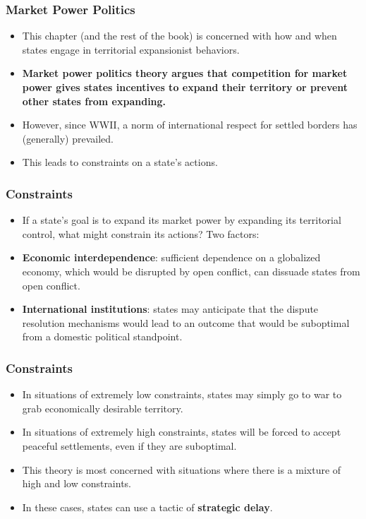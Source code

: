 \documentclass{beamer}
\begin{document}
\begin{frame} 
	\frametitle{\LARGE{Market Power Politics}}
	\begin{itemize}
		\item This chapter (and the rest of the book) is concerned with how and when states engage in territorial expansionist behaviors. \pause
		\item \textbf{Market power politics theory argues that competition for market power gives states incentives to expand their territory or prevent other states from expanding.}
		\item However, since WWII, a norm of international respect for settled borders has (generally) prevailed. \pause
		\item This leads to constraints on a state's actions. 
	\end{itemize}
\end{frame}

\begin{frame} 
	\frametitle{\LARGE{Constraints}}
	\begin{itemize}
		\item If a state's goal is to expand its market power by expanding its territorial control, what might constrain its actions? Two factors: \pause
		\item \textbf{Economic interdependence}: sufficient dependence on a globalized economy, which would be disrupted by open conflict, can dissuade states from open conflict. \pause
		\item \textbf{International institutions}: states may anticipate that the dispute resolution mechanisms would lead to an outcome that would be suboptimal from a domestic political standpoint.
	\end{itemize}
\end{frame}	

\begin{frame} 
	\frametitle{\LARGE{Constraints}}
	\begin{itemize}
		\item In situations of extremely low constraints, states may simply go to war to grab economically desirable territory. \pause
		\item In situations of extremely high constraints, states will be forced to accept peaceful settlements, even if they are suboptimal. \pause
		\item This theory is most concerned with situations where there is a mixture of high and low constraints. \pause 
		\item In these cases, states can use a tactic of \textbf{strategic delay}.
	\end{itemize}
\end{frame}	
\end{document}
